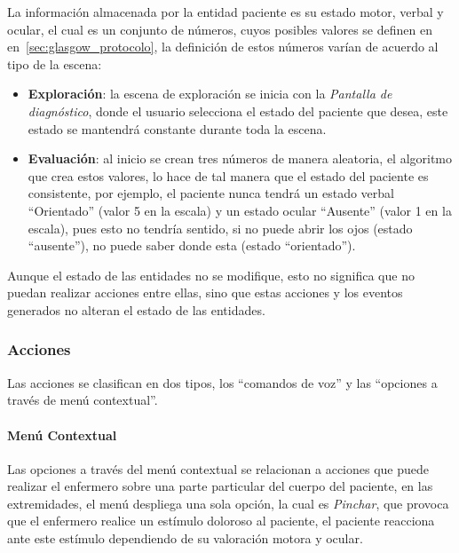 La información almacenada por la entidad paciente es su estado motor, verbal y
ocular, el cual es un conjunto de números, cuyos posibles valores se definen en
en~\ref{sec:glasgow_protocolo}, la definición de estos números varían de acuerdo
al tipo de la escena:

\begin{itemize}
    \item \textbf{Exploración}: la escena de exploración se inicia con la
        \emph{Pantalla de diagnóstico}, donde el usuario selecciona el estado
        del paciente que desea, este estado se mantendrá constante durante toda
        la escena.
    \item \textbf{Evaluación}: al inicio se crean tres números de manera
        aleatoria, el algoritmo que crea estos valores, lo hace de tal manera
        que el estado del paciente es consistente, por ejemplo, el paciente
        nunca tendrá un estado verbal \enquote{Orientado} (valor 5 en la escala)
        y un estado ocular \enquote{Ausente} (valor 1 en la escala), pues esto
        no tendría sentido, si no puede abrir los ojos (estado
        \enquote{ausente}), no puede saber donde esta (estado
        \enquote{orientado}).
\end{itemize}

Aunque el estado de las entidades no se modifique, esto no significa que no
puedan realizar acciones entre ellas, sino que estas acciones y los eventos
generados no alteran el estado de las entidades.

\subsubsection{Acciones} 

Las acciones se clasifican en dos tipos, los \enquote{comandos de voz} y las
\enquote{opciones a través de menú contextual}. 

\paragraph{Menú Contextual}

Las opciones a través del menú contextual se relacionan a acciones que puede
realizar el enfermero sobre una parte particular del cuerpo del paciente, en las
extremidades, el menú despliega una sola opción, la cual es \emph{Pinchar}, que
provoca que el enfermero realice un estímulo doloroso al paciente, el
paciente reacciona ante este estímulo dependiendo de su valoración motora y
ocular. 

